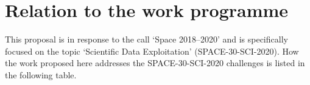 %



\section{Relation to the work programme}
\label{sec:relation-to-work-programme}

This proposal is in response to the call `Space 2018--2020' and is specifically focused on the topic `Scientific Data Exploitation' (SPACE-30-SCI-2020). How the work proposed here addresses the SPACE-30-SCI-2020 challenges is listed in the following table.

